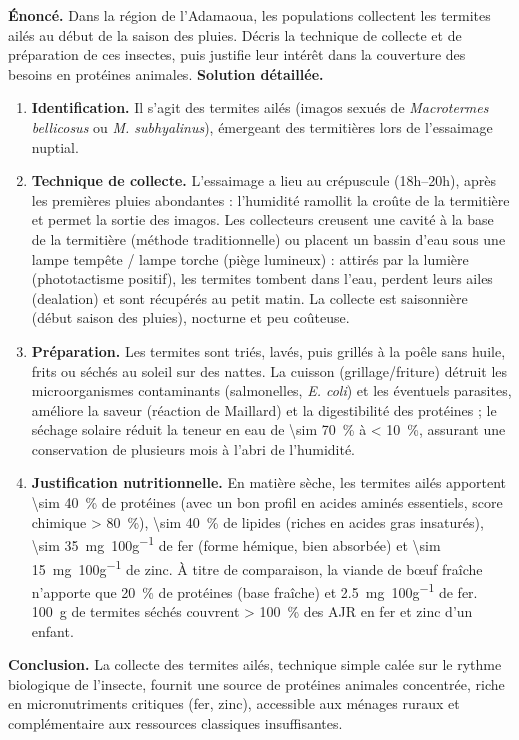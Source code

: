 \documentclass[11pt]{article}
\begin{document}
\begin{exoresolu}
\textbf{Énoncé.} Dans la région de l'Adamaoua, les populations collectent les termites ailés au début de la saison des pluies. Décris la technique de collecte et de préparation de ces insectes, puis justifie leur intérêt dans la couverture des besoins en protéines animales.
\tcblower
\textbf{Solution détaillée.}
\begin{enumerate}
\item \textbf{Identification.} Il s'agit des termites ailés (imagos sexués de \emph{Macrotermes bellicosus} ou \emph{M. subhyalinus}), émergeant des termitières lors de l'essaimage nuptial.
\item \textbf{Technique de collecte.} L'essaimage a lieu au crépuscule (18h--20h), après les premières pluies abondantes : l'humidité ramollit la croûte de la termitière et permet la sortie des imagos. Les collecteurs creusent une cavité à la base de la termitière (méthode traditionnelle) ou placent un bassin d'eau sous une lampe tempête / lampe torche (piège lumineux) : attirés par la lumière (phototactisme positif), les termites tombent dans l'eau, perdent leurs ailes (dealation) et sont récupérés au petit matin. La collecte est saisonnière (début saison des pluies), nocturne et peu coûteuse.
\item \textbf{Préparation.} Les termites sont triés, lavés, puis grillés à la poêle sans huile, frits ou séchés au soleil sur des nattes. La cuisson (grillage/friture) détruit les microorganismes contaminants (salmonelles, \emph{E. coli}) et les éventuels parasites, améliore la saveur (réaction de Maillard) et la digestibilité des protéines ; le séchage solaire réduit la teneur en eau de \SI{\sim 70}{\percent} à \SI{< 10}{\percent}, assurant une conservation de plusieurs mois à l'abri de l'humidité.
\item \textbf{Justification nutritionnelle.} En matière sèche, les termites ailés apportent \SI{\sim 40}{\percent} de protéines (avec un bon profil en acides aminés essentiels, score chimique \SI{> 80}{\percent}), \SI{\sim 40}{\percent} de lipides (riches en acides gras insaturés), \SI{\sim 35}{mg.100g^{-1}} de fer (forme hémique, bien absorbée) et \SI{\sim 15}{mg.100g^{-1}} de zinc. À titre de comparaison, la viande de bœuf fraîche n'apporte que \SI{20}{\percent} de protéines (base fraîche) et \SI{2,5}{mg.100g^{-1}} de fer. \SI{100}{g} de termites séchés couvrent \SI{> 100}{\percent} des AJR en fer et zinc d'un enfant.
\end{enumerate}
\textbf{Conclusion.} La collecte des termites ailés, technique simple calée sur le rythme biologique de l'insecte, fournit une source de protéines animales concentrée, riche en micronutriments critiques (fer, zinc), accessible aux ménages ruraux et complémentaire aux ressources classiques insuffisantes.
\end{exoresolu}
\end{document}
